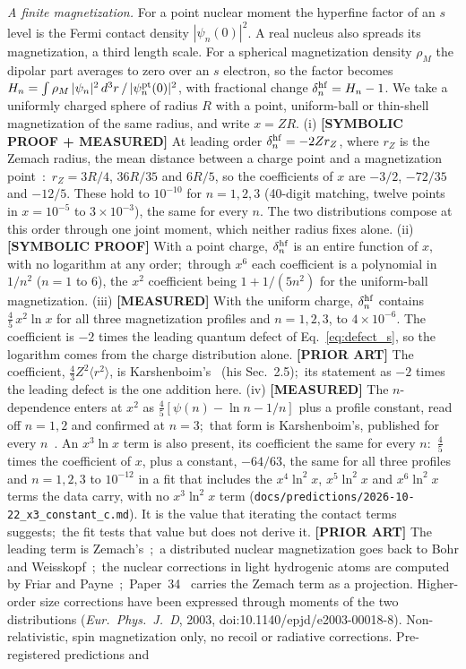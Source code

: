 \documentclass[twocolumn,prc,amsmath,amssymb,superscriptaddress]{revtex4-2}
\begin{document}
\emph{A finite magnetization.} For a point nuclear moment the hyperfine factor of an $s$ level is the Fermi contact density $|\psi_n(0)|^2$. A real nucleus also spreads its magnetization, a third length scale. For a spherical magnetization density $\rho_M$ the dipolar part averages to zero over an $s$ electron, so the factor becomes $H_n = \int \rho_M\,|\psi_n|^2\,d^3r \,/\, |\psi_n^{\rm pt}(0)|^2$, with fractional change $\delta^{\rm hf}_n = H_n - 1$. We take a uniformly charged sphere of radius $R$ with a point, uniform-ball or thin-shell magnetization of the same radius, and write $x = ZR$. (i) \textbf{[SYMBOLIC PROOF + MEASURED]} At leading order $\delta^{\rm hf}_n = -2Z r_Z$, where $r_Z$ is the Zemach radius, the mean distance between a charge point and a magnetization point~\cite{Zemach1956}:\ $r_Z = 3R/4$, $36R/35$ and $6R/5$, so the coefficients of $x$ are $-3/2$, $-72/35$ and $-12/5$. These hold to $10^{-10}$ for $n = 1, 2, 3$ (40-digit matching, twelve points in $x = 10^{-5}$ to $3\times 10^{-3}$), the same for every $n$. The two distributions compose at this order through one joint moment, which neither radius fixes alone. (ii) \textbf{[SYMBOLIC PROOF]} With a point charge, $\delta^{\rm hf}_n$ is an entire function of $x$, with no logarithm at any order;\ through $x^6$ each coefficient is a polynomial in $1/n^2$ ($n = 1$ to $6$), the $x^2$ coefficient being $1 + 1/(5n^2)$ for the uniform-ball magnetization. (iii) \textbf{[MEASURED]} With the uniform charge, $\delta^{\rm hf}_n$ contains $\tfrac45\,x^2\ln x$ for all three magnetization profiles and $n = 1, 2, 3$, to $4\times 10^{-6}$. The coefficient is $-2$ times the leading quantum defect of Eq.~\eqref{eq:defect_s}, so the logarithm comes from the charge distribution alone. \textbf{[PRIOR ART]} The coefficient, $\tfrac43 Z^2\langle r^2\rangle$, is Karshenboim's~\cite{Karshenboim1997} (his Sec.~2.5);\ its statement as $-2$ times the leading defect is the one addition here. (iv) \textbf{[MEASURED]} The $n$-dependence enters at $x^2$ as $\tfrac45[\psi(n) - \ln n - 1/n]$ plus a profile constant, read off $n = 1, 2$ and confirmed at $n = 3$;\ that form is Karshenboim's, published for every $n$~\cite{Karshenboim1997,Karshenboim2001}. An $x^3\ln x$ term is also present, its coefficient the same for every $n$:\ $\tfrac45$ times the coefficient of $x$, plus a constant, $-64/63$, the same for all three profiles and $n = 1, 2, 3$ to $10^{-12}$ in a fit that includes the $x^4\ln^2 x$, $x^5\ln^2 x$ and $x^6\ln^2 x$ terms the data carry, with no $x^3\ln^2 x$ term (\texttt{docs/predictions/2026-10-22\_x3\_constant\_c.md}). It is the value that iterating the contact terms suggests;\ the fit tests that value but does not derive it. \textbf{[PRIOR ART]} The leading term is Zemach's~\cite{Zemach1956};\ a distributed nuclear magnetization goes back to Bohr and Weisskopf~\cite{BohrWeisskopf1950};\ the nuclear corrections in light hydrogenic atoms are computed by Friar and Payne~\cite{FriarPayne2005};\ Paper~34~\cite{Paper34} carries the Zemach term as a projection. Higher-order size corrections have been expressed through moments of the two distributions (\textit{Eur.\ Phys.\ J.\ D}, 2003, doi:10.1140/epjd/e2003-00018-8). Non-relativistic, spin magnetization only, no recoil or radiative corrections. Pre-registered predictions and 
\end{document}
